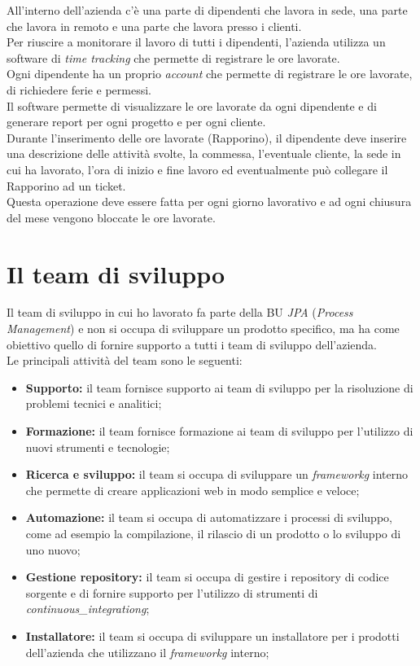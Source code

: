 All'interno dell'azienda c'è una parte di dipendenti che lavora in sede, una parte che lavora in remoto e una parte che lavora presso i clienti. \\
Per riuscire a monitorare il lavoro di tutti i dipendenti, l'azienda utilizza un software di \textit{time tracking} che permette di registrare le ore lavorate. \\
Ogni dipendente ha un proprio \textit{account} che permette di registrare le ore lavorate, di richiedere ferie e permessi. \\
Il software permette di visualizzare le ore lavorate da ogni dipendente e di generare report per ogni progetto e per ogni cliente. \\
Durante l'inserimento delle ore lavorate (Rapporino), il dipendente deve inserire una descrizione delle attività svolte, la commessa, l'eventuale cliente,
la sede in cui ha lavorato, l'ora di inizio e fine lavoro ed eventualmente può collegare il Rapporino ad un ticket. \\
Questa operazione deve essere fatta per ogni giorno lavorativo e ad ogni chiusura del mese vengono bloccate le ore lavorate. \\

\newpage

\section{Il team di sviluppo}
Il team di sviluppo in cui ho lavorato fa parte della BU \textit{JPA} (\textit{Process Management}) e non si
occupa di sviluppare un prodotto specifico, ma ha come obiettivo quello di fornire supporto a tutti i team di sviluppo
dell'azienda. \\
Le principali attività del team sono le seguenti:
\begin{itemize}
  \item \textbf{Supporto:} il team fornisce supporto ai team di sviluppo per la risoluzione di problemi tecnici e analitici;
  \item \textbf{Formazione:} il team fornisce formazione ai team di sviluppo per l'utilizzo di nuovi strumenti e tecnologie;
  \item \textbf{Ricerca e sviluppo:} il team si occupa di sviluppare un \textit{\gls{frameworkg}} interno che permette di creare applicazioni web in modo semplice e veloce;
  \item \textbf{Automazione:} il team si occupa di automatizzare i processi di sviluppo, come ad esempio la compilazione, il rilascio di un prodotto o lo sviluppo di uno nuovo; 
  \item \textbf{Gestione repository:} il team si occupa di gestire i repository di codice sorgente e di fornire supporto per l'utilizzo di strumenti di \textit{\gls{continuous_integrationg}};
  \item \textbf{Installatore:} il team si occupa di sviluppare un installatore per i prodotti dell'azienda che utilizzano il \textit{\gls{frameworkg}} interno;
\end{itemize}


